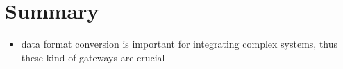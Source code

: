 \chapter{Summary}

\begin{itemize}
	\item data format conversion is important for integrating complex systems, thus these kind of gateways are crucial
\end{itemize}

